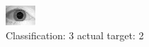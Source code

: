 \begin{figure}[h!]
\begin{center}
\includegraphics[width=0.60\columnwidth]{figures/ID1605_class_3_target_2.png}
\end{center}
\caption{ Classification: 3 actual target: 2}
\label{fig:ID1605_class_3_target_2}
\end{figure}
